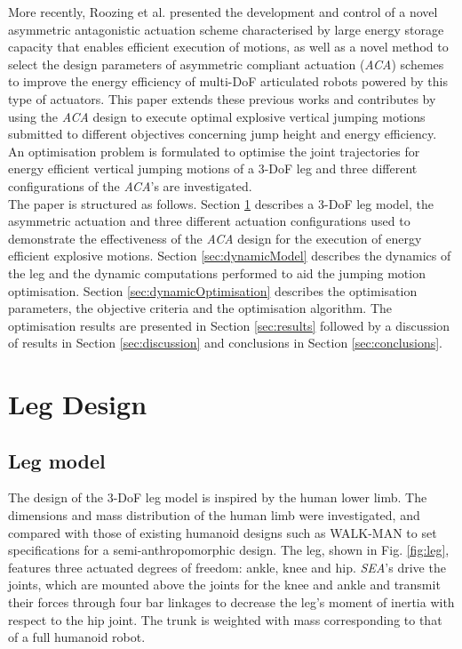 \documentclass[letterpaper, 10 pt, conference]{ieeeconf}  %
\begin{document}
More recently, Roozing et al. \cite{roozing2016design,roozing2016development} presented the development and control of a novel asymmetric antagonistic actuation scheme characterised by large energy storage capacity that enables efficient execution of motions, as well as a novel method to select the design parameters of asymmetric
compliant actuation (\textit{ACA}) schemes to improve the energy efficiency of multi-DoF articulated robots powered by this type of actuators. This paper extends these previous works and contributes by using the \textit{ACA} design to execute optimal explosive vertical jumping motions submitted to different objectives concerning jump height and energy efficiency. An optimisation problem is formulated to optimise the joint trajectories for energy efficient vertical jumping motions of a 3-DoF leg and three different configurations of the \textit{ACA}'s are investigated.\\
The paper is structured as follows. Section \ref{sec:legDesign} describes a 3-DoF leg model, the asymmetric actuation and three different actuation configurations used to demonstrate the effectiveness of the \textit{ACA} design for the execution of energy efficient explosive motions. Section \ref{sec:dynamicModel} describes the dynamics of the leg and the dynamic computations performed to aid the jumping motion optimisation. Section \ref{sec:dynamicOptimisation} describes the optimisation parameters, the objective criteria and the optimisation algorithm. The optimisation results are presented in Section \ref{sec:results} followed by a discussion of results in Section \ref{sec:discussion} and conclusions in Section \ref{sec:conclusions}.


\section{Leg Design } \label{sec:legDesign}

\subsection{Leg model}

The design of the 3-DoF leg model is inspired by the human lower limb. The dimensions and mass distribution of the human limb were investigated, and compared with those of existing humanoid designs such as WALK-MAN \cite{tsagarakis2017walk} to set specifications for a semi-anthropomorphic design. The leg, shown in Fig. \ref{fig:leg}, features three actuated degrees of freedom: ankle, knee and hip. \textit{SEA}'s drive the joints, which are mounted above the joints for the knee and ankle and transmit their forces through four bar linkages to decrease the leg’s moment of inertia with respect to the hip joint. The trunk is weighted with mass corresponding to that of a full humanoid robot.
\end{document}
